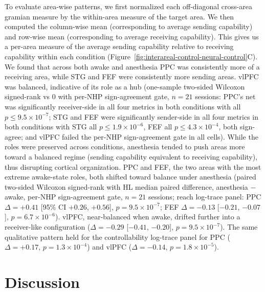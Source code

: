 To evaluate area-wise patterns, we first normalized each off-diagonal cross-area gramian measure by the within-area measure of the target area. We then computed the column-wise mean (corresponding to average sending capability) and row-wise mean (corresponding to average receiving capability). This gives us a per-area measure of the average sending capability relative to receiving capability within each condition (Figure~\ref{fig:interareal-control-neural-control}C). We found that across both awake and anesthesia PPC was consistently more of a receiving area, while STG and FEF were consistently more sending areas. vlPFC was balanced, indicative of its role as a hub (one-sample two-sided Wilcoxon signed-rank vs $0$ with per-NHP sign-agreement gate, $n=21$ sessions: PPC's net was significantly receiver-side in all four metrics in both conditions with all $p\leq 9.5\!\times\!10^{-7}$; STG and FEF were significantly sender-side in all four metrics in both conditions with STG all $p\leq 1.9\!\times\!10^{-6}$, FEF all $p\leq 4.3\!\times\!10^{-4}$, both sign-agree; and vlPFC failed the per-NHP sign-agreement gate in all cells). While the roles were preserved across conditions, anesthesia tended to push areas more toward a balanced regime (sending capability equivalent to receiving capability), thus disrupting cortical organization. PPC and FEF, the two areas with the most extreme awake-state roles, both shifted toward balance under anesthesia (paired two-sided Wilcoxon signed-rank with HL median paired difference, anesthesia $-$ awake, per-NHP sign-agreement gate, $n=21$ sessions; reach log-trace panel: PPC $\Delta=+0.41$ [95\% CI $+0.26$, $+0.56$], $p=9.5\!\times\!10^{-7}$; FEF $\Delta=-0.13$ [$-0.21$, $-0.07$], $p=6.7\!\times\!10^{-6}$). vlPFC, near-balanced when awake, drifted further into a receiver-like configuration ($\Delta=-0.29$ [$-0.41$, $-0.20$], $p=9.5\!\times\!10^{-7}$). The same qualitative pattern held for the controllability log-trace panel for PPC ($\Delta=+0.17$, $p=1.3\!\times\!10^{-4}$) and vlPFC ($\Delta=-0.14$, $p=1.8\!\times\!10^{-5}$).

\section{Discussion}
\label{sec:interareal-control-discussion}

